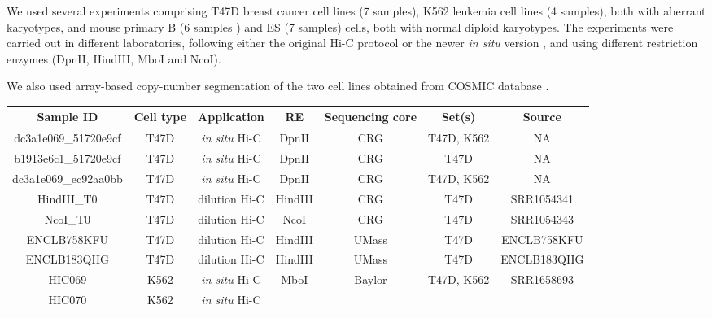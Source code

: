 \documentclass{bioinfo}
\begin{document}
\begin{methods}
We used several experiments comprising T47D breast cancer cell
lines (7 samples), K562 leukemia cell lines (4 samples), both with
aberrant karyotypes, and mouse primary B (6 samples ) and ES (7 samples)
cells, both with normal diploid karyotypes. The experiments were carried
out in different laboratories, following either the original Hi-C protocol
\citep{lieberman2009comprehensive} or the newer \textit{in situ} version
\citep{rao20143d}, and using different restriction enzymes (DpnII,
HindIII, MboI and NcoI).

We also used array-based copy-number segmentation of the two cell
lines obtained from COSMIC database \citep{forbes2010cosmic}.

\begin{table}
{\begin{tabular}{ccccccc}
  \toprule
  \textbf{Sample ID} & \textbf{Cell type} & \textbf{Application} &
  \textbf{RE} & \textbf{Sequencing core} & \textbf{Set(s)} &
  \textbf{Source} \\
  \midrule
dc3a1e069\_51720e9cf & T47D & \textit{in situ} Hi-C &
  DpnII & CRG & T47D, K562 & NA \\
b1913e6c1\_51720e9cf & T47D & \textit{in situ} Hi-C &
  DpnII & CRG & T47D & NA \\
dc3a1e069\_ec92aa0bb & T47D & \textit{in situ} Hi-C &
  DpnII & CRG & T47D, K562 & NA \\
HindIII\_T0 & T47D & dilution Hi-C &
  HindIII & CRG & T47D & SRR1054341 \\
NcoI\_T0    & T47D & dilution Hi-C &
  NcoI      & CRG & T47D & SRR1054343 \\
ENCLB758KFU & T47D & dilution Hi-C &
  HindIII   & UMass & T47D & ENCLB758KFU \\
ENCLB183QHG & T47D & dilution Hi-C &
  HindIII   & UMass & T47D & ENCLB183QHG \\
HIC069  & K562 & \textit{in situ} Hi-C &
  MboI & Baylor & T47D, K562 &    SRR1658693 \\
HIC070  & K562 & \textit{in situ} Hi-C &

\end{tabular}}
\end{table}
\end{methods}
\end{document}
